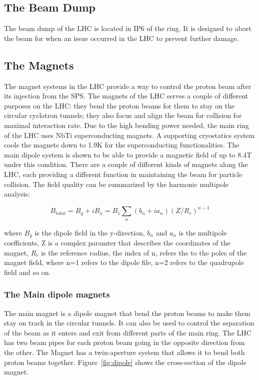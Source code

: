 \subsection{The Beam Dump}
The beam dump of the LHC is located in IP6 of the ring. It is designed to abort the beam for when an issue occurred in the LHC to prevent further damage. 

\subsection{The Magnets}
The magnet systems in the LHC provide a way to control the proton beam after its injection from the SPS. The magnets of the LHC serves a couple of different purposes on the LHC: they bend the proton beams for them to stay on the circular cyclotron tunnels; they also focus and align the beam for collision for maximal interaction rate. Due to the high bending power needed, the main ring of the LHC uses NbTi superconducting magnets.  A supporting cryostatics system cools the magnets down to 1.9K
for the superconducting functionalities. The main dipole system is shown to be able to provide a magnetic field of up to 8.4T under this condition. There are a couple of different kinds of magnets along the
LHC, each providing a different function in maintaining the beam for particle collision. The field quality can be summarized by the harmonic multipole analysis: 

\begin{equation}
 B_{total} = B_y+ iB_x  = B_1\sum_n(b_{n} + i a_{n})(Z/R_{r})^{n-1}
\end{equation}

where $B_y$ is the dipole field in the y-direction, $b_{n}$ and $a_n$ is the multipole coefficients, Z is a complex paramter that describes the coordinates of the magnet, $R_{r}$ is the reference radius, the index of n, refers the to the poles of the magnet field, where n=1 refers to the dipole file, n=2 refers to the quadrupole field and so on. 

\subsubsection*{The Main dipole magnets}
The main magnet is a dipole magnet that bend the proton beams to make them stay on track in the circular tunnels. It can also be used to control the separation of the beam as it enters and exit from different parts of the main ring. 
The LHC has two beam pipes for each proton beam going in the opposite direction from the other. The Magnet has a twin-aperture system that allows it to bend both proton beams together. Figure~\ref{fig:dipole} shows the cross-section of the dipole magnet. 

